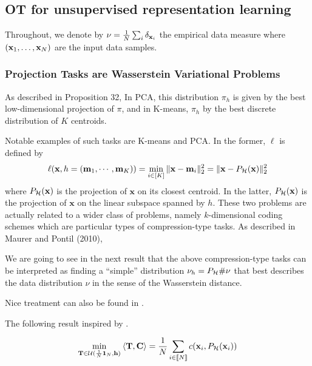 \subsection{OT for unsupervised representation learning}

Throughout, we denote by $\nu = \frac{1}{N} \sum_i \delta_{{\mathbf{x}}_i}$ the empirical data measure where $({\mathbf{x}}_1, \ldots, {\mathbf{x}}_N)$ are the input data samples.


\subsubsection{Projection Tasks are Wasserstein Variational Problems}


As described in Proposition 32,  In PCA, this distribution \(\pi_h\) is given by the best low-dimensional projection of
\(\pi\), and in K-means, \(\pi_h\) by the best discrete distribution of \(K\) centroids.

Notable examples of such tasks are K-means and PCA. In the former, \(\ell\) is defined by
\[
\ell(\mathbf{x}, h = ({\mathbf{m}}_1, \cdots, {\mathbf{m}}_K)) = \min_{i \in [K]} \|\mathbf{x} - {\mathbf{m}}_i\|_2^2 = \|\mathbf{x} - P_{{\mathcal{H}}}(\mathbf{x})\|_2^2
\]
where \(P_{{\mathcal{H}}}(\mathbf{x})\) is the projection of \(\mathbf{x}\) on its closest centroid. In the latter, \(P_{{\mathcal{H}}}(\mathbf{x})\) is the projection of \(\mathbf{x}\) on the linear subspace spanned by \(h\). These two problems are actually related to a wider class of problems, namely \(k\)-dimensional coding schemes which are particular types of compression-type tasks. As described in Maurer and Pontil (2010),


We are going to see in the next result that the above compression-type tasks can be interpreted as finding a “simple” distribution $\nu_h = P_{{\mathcal{H}}} \# \nu$ that best describes the data distribution $\nu$ in the sense of the Wasserstein distance.

Nice treatment can also be found in \citep{vayer2023controlling}.

The following result inspired by \citep{Canas12}.

\begin{lemma}
    \begin{align}
        \min_{{\mathbf{T}} \in {\mathcal{U}}(\frac{1}{N} \bm{1}_N, {\mathbf{h}})} \: \langle {\mathbf{T}}, {\mathbf{C}} \rangle = \frac{1}{N} \sum_{i \in {[\![N]\!]}} c(\mathbf{x}_i, P_{{\mathcal{H}}}(\mathbf{x}_i))
    \end{align}
\end{lemma}

